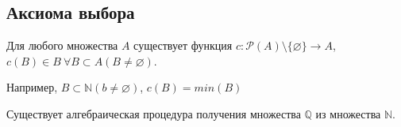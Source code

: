 \subsection{Аксиома выбора}
    
    \begin{definition}
        Для любого множества $A$ существует функция $c: \mathcal {P}(A) \setminus \{\varnothing\} \longrightarrow A$, $c(B) \in B \  \forall B \subset A (B \neq \varnothing)$.
    \end{definition}
    
    \begin{note}
        Например, $B \subset \mathds{N} (b \neq \varnothing)$, $c(B) = min(B)$
    \end{note}
    
    Существует алгебраическая процедура получения множества $\mathds{Q}$ из множества $\mathds{N}$.